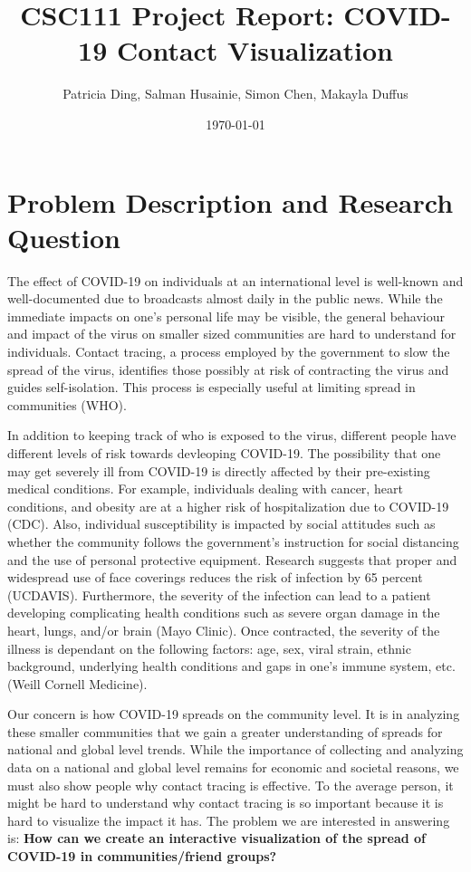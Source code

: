\documentclass[fontsize=11pt]{article}
\title{CSC111 Project Report: COVID-19 Contact Visualization}
\author{Patricia Ding, Salman Husainie, Simon Chen, Makayla Duffus}
\date{\today}
\begin{document}
\maketitle

\section*{Problem Description and Research Question}
The effect of COVID-19 on individuals at an international level is well-known and well-documented due to broadcasts almost daily in the public news. While the immediate impacts on one's personal life may be visible, the general behaviour and impact of the virus on smaller sized communities are hard to understand for individuals. Contact tracing, a process employed by the government to slow the spread of the virus, identifies those possibly at risk of contracting the virus and guides self-isolation. This process is especially useful at limiting spread in communities (WHO).

In addition to keeping track of who is exposed to the virus, different people have different levels of risk towards devleoping COVID-19. The possibility that one may get severely ill from COVID-19 is directly affected by their pre-existing medical conditions. For example, individuals dealing with cancer, heart conditions, and obesity are at a higher risk of hospitalization due to COVID-19 (CDC). Also, individual susceptibility is impacted by social attitudes such as whether the community follows the government's instruction for social distancing and the use of personal protective equipment. Research suggests that proper and widespread use of face coverings reduces the risk of infection by 65 percent (UCDAVIS). Furthermore, the severity of the infection can lead to a patient developing complicating health conditions such as severe organ damage in the heart, lungs, and/or brain (Mayo Clinic). Once contracted, the severity of the illness is dependant on the following factors: age, sex, viral strain, ethnic background, underlying health conditions and gaps in one's immune system, etc. (Weill Cornell Medicine).

Our concern is how COVID-19 spreads on the community level. It is in analyzing these smaller communities that we gain a greater understanding of spreads for national and global level trends. While the importance of collecting and analyzing data on a national and global level remains for economic and societal reasons, we must also show people why contact tracing is effective. To the average person, it might be hard to understand why contact tracing is so important because it is hard to visualize the impact it has. The problem we are interested in answering is: \textbf{How can we create an interactive visualization of the spread of COVID-19 in communities/friend groups?}
\newpage
%
\end{document}
